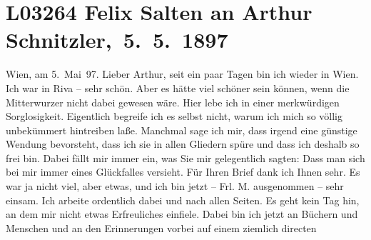 

\section[ Felix Salten an Arthur Schnitzler, 5. 5. 1897]{L03264 Felix Salten an Arthur Schnitzler, 5. 5. 1897}
\nopagebreak{}
\rehead{ }\normalsize\beginnumbering{}
\toendnotes[C]{\smallbreak\pagebreak[2]}
\toendnotes[C]{\smallbreak}
\pstart
           \raggedleft{}{\pb}Wien, am 5. Mai 97.\pend
           \vspace{0.5em}
\pstart
           Lieber Arthur, seit ein paar Tagen bin ich wieder in Wien. Ich war in Riva – sehr schön. Aber es hätte viel schöner sein können, wenn die Mitterwurzer nicht dabei gewesen wäre. Hier lebe ich in einer
               merkwürdigen Sorglosigkeit. Eigentlich begreife ich es selbst nicht, warum ich mich
               so völlig unbekümmert hintreiben laße. Manchmal sage ich mir, dass irgend eine
               günstige Wendung bevorsteht, dass ich sie in allen Gliedern spüre und dass ich
               deshalb so frei bin. Dabei fällt mir immer ein, was Sie mir gelegentlich sagten: Dass
               man sich bei mir immer eines Glückfalles versieht. Für Ihren Brief dank ich Ihnen
               sehr. Es war ja nicht viel, aber etwas, und ich bin jetzt – Frl. M. ausgenommen – sehr einsam. Ich arbeite ordentlich dabei
                  {\pb}und nach allen Seiten. Es
               geht kein Tag hin, an dem mir nicht etwas Erfreuliches einfiele. Dabei bin ich jetzt
               an Büchern und Menschen und an den Erinnerungen vorbei auf einem ziemlich directen
